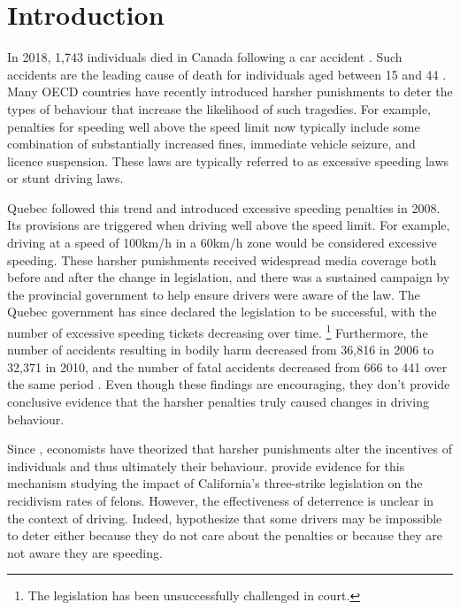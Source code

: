 \section{Introduction}
\label{sec:Introduction}

In 2018, 1,743 individuals died in Canada following a car accident 
\citep{transcan2018}. 
Such accidents are the leading cause of death for individuals aged between 15 and 44
\citep{statscan2020}.   
Many OECD countries have recently introduced harsher punishments to deter 
the types of behaviour that increase the likelihood of such tragedies. 
For example, penalties for speeding well above the speed limit now typically include 
some combination of substantially increased fines, immediate vehicle seizure, and licence suspension.
These laws are typically referred to as excessive speeding laws or stunt driving laws. 

Quebec followed this trend and introduced excessive speeding penalties in 2008. 
Its provisions are triggered when driving well above the speed limit. 
For example, driving at a speed of 100km/h in a 60km/h zone would be considered excessive speeding.
These harsher punishments received widespread media coverage 
both before and after the change in legislation, 
and there was a sustained campaign by the provincial government 
to help ensure drivers were aware of the law. 
The Quebec government has since declared the legislation to be successful, 
with the number of excessive speeding tickets decreasing over time.%
\footnote{The legislation has been unsuccessfully challenged in court.}
%
Furthermore, the number of accidents resulting in bodily harm 
decreased from 36,816 in 2006 to 32,371 in 2010, 
and the number of fatal accidents decreased from 666 to 441 
over the same period 
\citep{saaq2011}. 
Even though these findings are encouraging, 
they don’t provide conclusive evidence that the harsher penalties truly caused changes in driving behaviour. 


Since 
\citet{becker1968b}, 
economists have theorized that harsher punishments 
alter the incentives of individuals and thus ultimately their behaviour. 
\citet{hellandtabarrok2007} 
provide evidence for this mechanism 
studying the impact of California’s three-strike legislation on the recidivism rates of felons. 
However, the effectiveness of deterrence is unclear in the context of driving. 
Indeed, 
\citet{bourgeonpicard2007} 
hypothesize that some drivers may be impossible to deter 
either because they do not care about the penalties or because they are not aware they are speeding.


